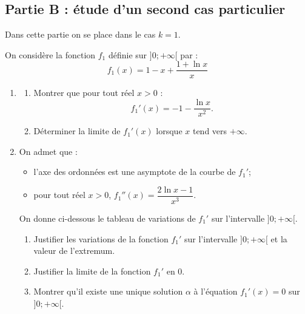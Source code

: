 \documentclass[10pt]{article}
\providecommand{\e}{{\mathrm{e}}}
\begin{document}
	\subsection*{Partie B : étude d'un second cas particulier}
		Dans cette partie on se place dans le cas $k=1$.

		\medskip

		On considère la fonction $f_{1}$ définie sur $] 0 ;+\infty[$ par :
		\[f_{1}(x)=1-x+\dfrac{1+\ln x}{x}\]

		\begin{enumerate}
			\item \begin{enumerate}
				\item Montrer que pour tout réel $x>0$ :
				\[f_{1}'(x)=-1-\dfrac{\ln x}{x^{2}}.\]

				\item Déterminer la limite de $f_{1}'(x)$ lorsque $x$ tend vers $+\infty$.
			\end{enumerate}

			\item On admet que :
			\begin{itemize}[leftmargin=1cm]
				\item l'axe des ordonnées est une asymptote de la courbe de $f_{1}'$;
				\item pour tout réel $x>0$, \quad $f_{1}''(x)=\dfrac{2 \ln x-1}{x^{3}}$.
			\end{itemize}

			On donne ci-dessous le tableau de variations de $f_{1}'$ sur l'intervalle $] 0 ;+\infty[$.

			\begin{center}
			\end{center}

			\begin{enumerate}
				\item Justifier les variations de la fonction $f_{1}'$ sur l'intervalle $]0 ;+\infty[$ et la valeur de l'extremum.

				\item Justifier la limite de la fonction $f_{1}'$ en 0.

				\item Montrer qu'il existe une unique solution $\alpha$ à l'équation \quad $f_{1}'(x)=0$ \quad sur $] 0 ;+\infty[$.


\end{enumerate}
\end{enumerate}
\end{document}
